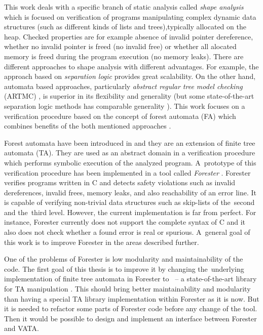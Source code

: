 This work deals with a specific branch of static analysis called \emph{shape analysis} which is focused on verification of programs manipulating
complex dynamic data structures (such as different kinds of lists and trees),typically allocated on the heap.
Checked properties are for example absence of invalid pointer dereference,
whether no invalid pointer is freed (no invalid free) or
whether all alocated memory is freed during the program execution (no memory leaks).
There are different approaches to shape analysis with different advantages.
For example, the approach based on \emph{separation logic} \cite{seplog,seplog07} provides great scalability.
On the other hand, automata based approaches, particularly \emph{abstract regular tree model checking} (ARTMC) \cite{artmc}, is
superior in its flexibility and generality (but some state-of-the-art separation logic methods
has comparable generality \cite{biabduction}).
This work focuses on a verification procedure based on the concept of forest automata (FA) which
combines benefits of the both mentioned approaches \cite{forester11}.

Forest automata have been introduced in \cite{forester11} and
they are an extension of finite tree automata (TA).
They are used as an abstract domain in a verification procedure which performs symbolic execution of the analyzed program.
A~prototype of this verification procedure has been implemented in a tool called \emph{Forester} \cite{www:forester}.
Forester verifies programs written in C and detects safety violations such as invalid dereferences, invalid frees,
memory leaks, and also reachability of an error line.
It is capable of verifying non-trivial data structures such as skip-lists of the~second and the~third level.
However, the current implementation is far from perfect.
For instance, Forester currently does not support the complete syntax of C and %
it also does not check whether a found error is real or spurious.
A~general goal of this work is to improve Forester in the areas described further.

One of the problems of Forester is low modularity and maintainability of the code.
The first goal of this thesis is to improve it by changing the~underlying implementation
of finite tree automata in Forester to \vata\ -- a state-of-the-art library for TA manipulation \cite{libvata}.
This should bring better maintainability and modularity than having
a special TA library implementation within Forester as it is now.
But it is needed to refactor some parts of Forester code before any change of the tool.
Then it would be possible to design and implement an interface between Forester and VATA.

